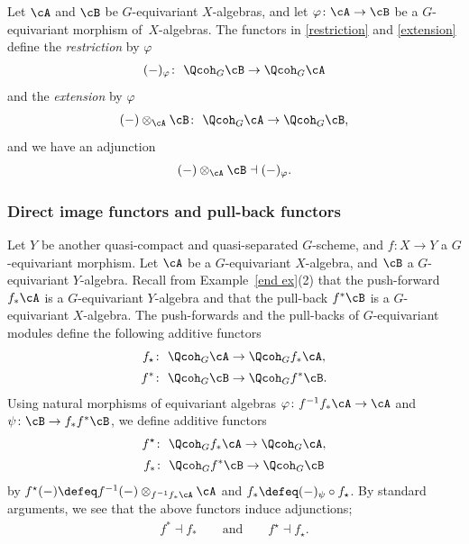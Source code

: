 Let $\cA$ and $\cB$ be $G$-equivariant $X$-algebras, and let $\varphi\colon \cA\to \cB$ be a $G$-equivariant morphism of~$X$-algebras. The functors in \eqref{restriction} and \eqref{extension} define the {\it restriction} by $\varphi$
\begin{gather*}
(-)_{\varphi}\colon\ \Qcoh_G\cB\to \Qcoh_G\cA
\end{gather*}
and the {\it extension} by $\varphi$
\begin{gather*}
(-)\otimes_{\cA}\cB\colon\ \Qcoh_G\cA\to \Qcoh_G\cB,
\end{gather*}
and we have an adjunction
\begin{equation}\label{rest ext adj}
(-)\otimes_{\cA}\cB\dashv (-)_{\varphi}.
\end{equation}

\subsubsection{Direct image functors and pull-back functors}%
Let $Y$ be another quasi-compact and quasi-separated $G$-scheme, and $f\colon X\to Y$ a $G$-equivariant morphism.
Let $\cA$ be a $G$-equivariant $X$-algebra, and $\cB$ a $G$-equivariant $Y$-algebra. Recall from Example~\ref{end ex}(2) that the push-forward $f_*\cA$ is a $G$-equivariant $Y$-algebra and that the pull-back $f^*\cB$ is a $G$-equivariant $X$-algebra. The push-forwards and the pull-backs of $G$-equivariant modules define the following additive functors
\begin{gather*}
f_{\star}\colon\ \Qcoh_G\cA\to \Qcoh_Gf_*\cA,
\\[.5ex]
f^*\colon\ \Qcoh_G\cB \to \Qcoh_Gf^*\cB.
\end{gather*}
Using natural morphisms of equivariant algebras
$\varphi\colon f^{-1}f_*\cA\to \cA$ and $\psi\colon \cB\to f_*f^*\cB$,
we define additive functors
\begin{gather*}
f^{\star}\colon\ \Qcoh_Gf_*\cA\to\Qcoh_G\cA,
\\[.5ex]
f_{*}\colon\ \Qcoh_Gf^*\cB\to \Qcoh_G\cB
\end{gather*}
by $f^{\star}(-)\defeq f^{-1}(-)\otimes_{f^{-1}f_*\cA}\cA$ and $f_{*}\defeq(-)_{\psi}\circ f_{\star}$.
By standard arguments, we see that the above functors induce adjunctions;
\begin{gather*}
f^*\dashv f_{*}\qquad\text{and}\qquad f^{\star}\dashv f_{\star}.
\end{gather*}




